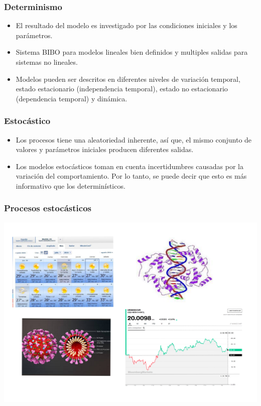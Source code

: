 \documentclass[spanish]{beamer}
\begin{document}
\begin{frame}
\frametitle{Determinismo} 
 \begin{itemize}
 \item El resultado del modelo es investigado por las condiciones iniciales y los parámetros.
 \item Sistema BIBO para modelos lineales bien definidos y multiples salidas para sistemas no lineales.
 \item Modelos pueden ser descritos en diferentes niveles de variación temporal, estado estacionario (independencia temporal), estado no estacionario (dependencia temporal) y dinámica. 
 \end{itemize}
\end{frame}
\begin{frame}
\frametitle{Estocástico}
 \begin{itemize}
 \item Los procesos tiene una aleatoriedad inherente, así que, el mismo conjunto de valores y parámetros iniciales producen diferentes salidas. 
  
 \item Los modelos estocásticos toman en cuenta incertidumbres causadas por la variación del comportamiento. Por lo tanto, se puede decir que esto es más informativo que los determinísticos. 

 \end{itemize}

\end{frame}
\begin{frame}
\frametitle{Procesos estocásticos}
\begin{center}
\includegraphics[scale=0.4]{im2}
\end{center}
\end{frame}
\end{document}
